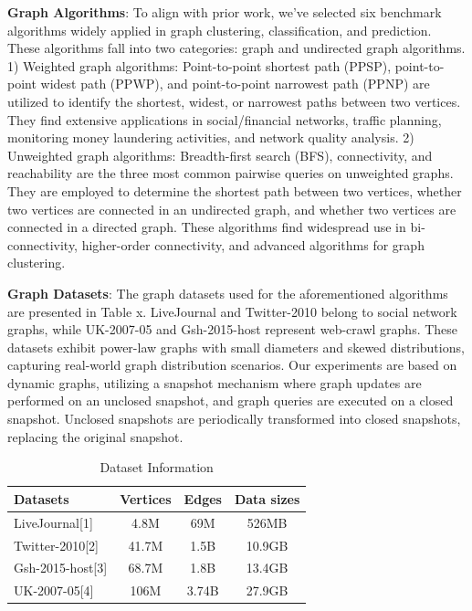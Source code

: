 \documentclass[lettersize,journal]{IEEEtran} %
\begin{document}
{\bf{Graph Algorithms}}: To align with prior work\cite{pnp}\cite{tripoline}\cite{sgraph}\cite{glign}, we've selected six benchmark algorithms widely applied in graph clustering, classification, and prediction. These algorithms fall into two categories: graph and undirected graph algorithms. 1) Weighted graph algorithms: Point-to-point shortest path (PPSP)\cite{ppsp_1}\cite{ppsp_2}\cite{ppsp_3}, point-to-point widest path (PPWP)\cite{ppwp}, and point-to-point narrowest path (PPNP)\cite{ppnp} are utilized to identify the shortest, widest, or narrowest paths between two vertices. They find extensive applications in social/financial networks, traffic planning, monitoring money laundering activities, and network quality analysis. 2) Unweighted graph algorithms: Breadth-first search (BFS)\cite{bfs}, connectivity\cite{reachability_1}\cite{reachability_2}\cite{reachability_3}, and reachability\cite{connectivity} are the three most common pairwise queries on unweighted graphs. They are employed to determine the shortest path between two vertices, whether two vertices are connected in an undirected graph, and whether two vertices are connected in a directed graph. These algorithms find widespread use in bi-connectivity, higher-order connectivity, and advanced algorithms for graph clustering.

{\bf{Graph Datasets}}: The graph datasets used for the aforementioned algorithms are presented in Table x. LiveJournal and Twitter-2010 belong to social network graphs, while UK-2007-05 and Gsh-2015-host represent web-crawl graphs. These datasets exhibit power-law graphs with small diameters and skewed distributions, capturing real-world graph distribution scenarios. Our experiments are based on dynamic graphs, utilizing a snapshot mechanism where graph updates are performed on an unclosed snapshot, and graph queries are executed on a closed snapshot. Unclosed snapshots are periodically transformed into closed snapshots, replacing the original snapshot.

\begin{table}[h]
    \centering
    \begin{tabular}{lccc}
    \hline
    Datasets          & Vertices & Edges  & Data sizes \\
    \hline
    LiveJournal[1]    & 4.8M     & 69M    & 526MB      \\
    Twitter-2010[2]   & 41.7M    & 1.5B   & 10.9GB     \\
    Gsh-2015-host[3]  & 68.7M    & 1.8B   & 13.4GB     \\
    UK-2007-05[4]     & 106M     & 3.74B  & 27.9GB     \\
    \hline
    \end{tabular}
    \caption{Dataset Information}
    \end{table}
\end{document}
